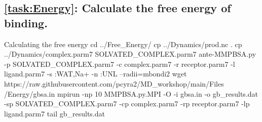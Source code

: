     \subsection{\cref{task:Energy}: Calculate the free energy of binding.}
    \begin{bashcmd}[label=cmd:task7]{Calculating the free energy}
    cd ../Free_Energy/
    cp ../Dynamics/prod.nc .
    cp ../Dynamics/complex.parm7 SOLVATED_COMPLEX.parm7
    ante-MMPBSA.py -p SOLVATED_COMPLEX.parm7 -c complex.parm7 -r receptor.parm7 -l ligand.parm7 -s :WAT,Na+ -n :UNL --radii=mbondi2
    wget https://raw.githubusercontent.com/pcyra2/MD_workshop/main/Files /Energy/gbsa.in
    mpirun -np 10 MMPBSA.py.MPI -O -i gbsa.in -o gb_results.dat -sp SOLVATED_COMPLEX.parm7 -cp complex.parm7 -rp receptor.parm7 -lp ligand.parm7
    tail gb_results.dat
    \end{bashcmd}
